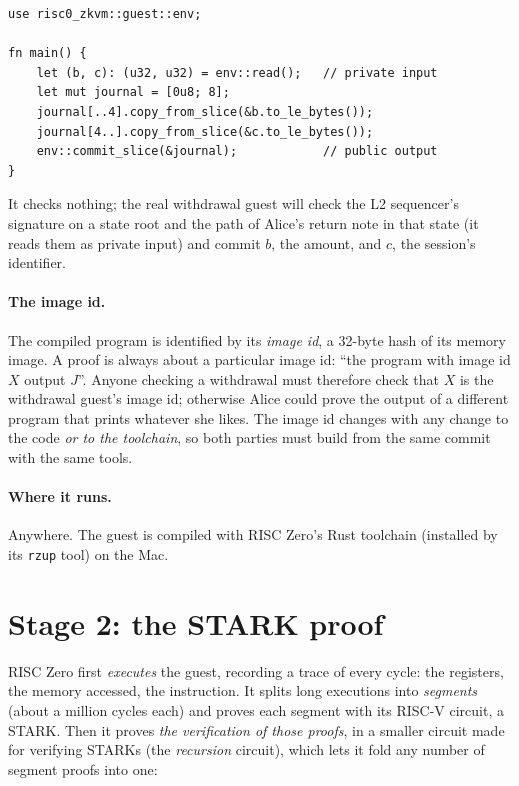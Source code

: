 \documentclass[11pt]{article}
\begin{document}
\begin{lstlisting}[style=code]
use risc0_zkvm::guest::env;

fn main() {
    let (b, c): (u32, u32) = env::read();   // private input
    let mut journal = [0u8; 8];
    journal[..4].copy_from_slice(&b.to_le_bytes());
    journal[4..].copy_from_slice(&c.to_le_bytes());
    env::commit_slice(&journal);            // public output
}
\end{lstlisting}

It checks nothing; the real withdrawal guest will check the L2
sequencer's signature on a state root and the path of Alice's return
note in that state (it reads them as private input) and commit $b$, the
amount, and $c$, the session's identifier.

\paragraph{The image id.} The compiled program is identified by its
\emph{image id}, a 32-byte hash of its memory image. A proof is always
about a particular image id: ``the program with image id $X$ output
$J$''. Anyone checking a withdrawal must therefore check that $X$ is the
withdrawal guest's image id; otherwise Alice could prove the output of a
different program that prints whatever she likes. The image id changes
with any change to the code \emph{or to the toolchain}, so both parties
must build from the same commit with the same tools.

\paragraph{Where it runs.} Anywhere. The guest is compiled with RISC
Zero's Rust toolchain (installed by its \texttt{rzup} tool) on the Mac.

\section{Stage 2: the STARK proof}
\label{sec:stark}

RISC Zero first \emph{executes} the guest, recording a trace of every
cycle: the registers, the memory accessed, the instruction. It splits
long executions into \emph{segments} (about a million cycles each) and
proves each segment with its RISC-V circuit, a STARK. Then it proves
\emph{the verification of those proofs}, in a smaller circuit made for
verifying STARKs (the \emph{recursion} circuit), which lets it fold any
number of segment proofs into one:
\end{document}
